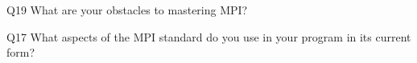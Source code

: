 \begin{description}%
\item{Q19} What are your obstacles to mastering MPI?%
\item{Q17} What aspects of the MPI standard do you use in your program in its current form?%
\end{description}%
